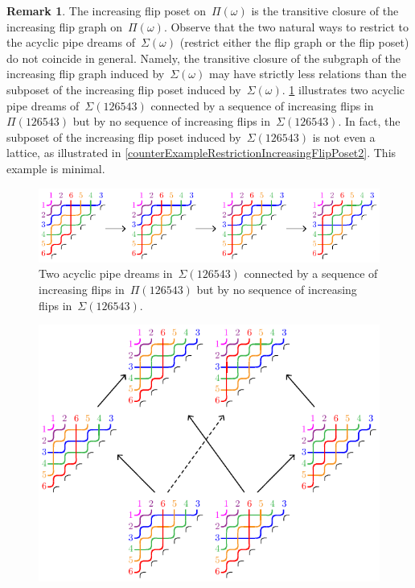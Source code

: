 \documentclass[reqno]{amsart}
\theoremstyle{definition}
\newtheorem{remark}[theorem]{Remark}
\newcommand{\pipeDreams}{\Pi} %
\newcommand{\acyclicPipeDreams}{\Sigma} %
\begin{document}
\begin{remark}
\label{rem:acyclicIncreasingFlipPosetNotLattice}
The increasing flip poset on~$\pipeDreams(\omega)$ is the transitive closure of the increasing flip graph on~$\pipeDreams(\omega)$.
Observe that the two natural ways to restrict to the acyclic pipe dreams of~$\acyclicPipeDreams(\omega)$ (restrict either the flip graph or the flip poset) do not coincide in general.
Namely, the transitive closure of the subgraph of the increasing flip graph induced by~$\acyclicPipeDreams(\omega)$ may have strictly less relations than the subposet of the increasing flip poset induced by~$\acyclicPipeDreams(\omega)$.
\cref{fig:counterExampleRestrictionIncreasingFlipPoset1} illustrates two acyclic pipe dreams of~$\acyclicPipeDreams(126543)$ connected by a sequence of increasing flips in~$\pipeDreams(126543)$ but by no sequence of increasing flips in~$\acyclicPipeDreams(126543)$.
In fact, the subposet of the increasing flip poset induced by~$\acyclicPipeDreams(126543)$ is not even a lattice, as illustrated in \cref{counterExampleRestrictionIncreasingFlipPoset2}.
This example is minimal.
%
%
\begin{figure}[ht]
	\centerline{\includegraphics[scale=1.2]{counterExampleRestrictionIncreasingFlipPoset1}}
	\caption{Two acyclic pipe dreams in~$\acyclicPipeDreams(126543)$ connected by a sequence of increasing flips in~$\pipeDreams(126543)$ but by no sequence of increasing flips in~$\acyclicPipeDreams(126543)$.}
	\label{fig:counterExampleRestrictionIncreasingFlipPoset1}
\end{figure}
%
\begin{figure}[ht]
	\centerline{\includegraphics[scale=1.2]{counterExampleRestrictionIncreasingFlipPoset2}}

\end{figure}
\end{remark}
\end{document}
